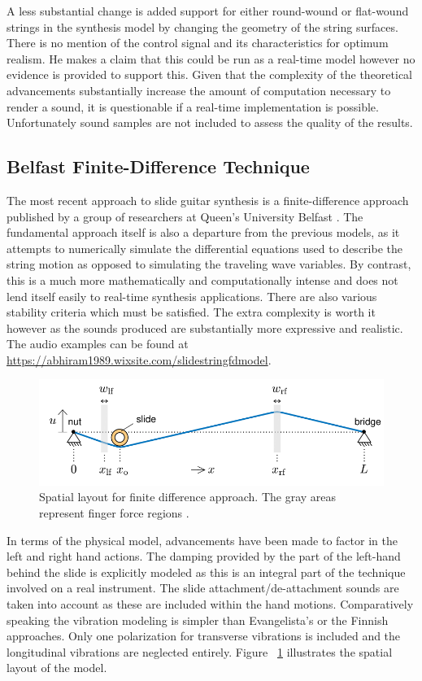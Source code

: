 \documentclass[main.tex]{subfiles}
\begin{document}
A less substantial change is added support for either round-wound or flat-wound strings in the synthesis model by changing the geometry of the string surfaces. There is no mention of the control signal and its characteristics for optimum realism. He makes a claim that this could be run as a real-time model however no evidence is provided to support this. Given that the complexity of the theoretical advancements substantially increase the amount of computation necessary to render a sound, it is questionable if a real-time implementation is possible. Unfortunately sound samples are not included to assess the quality of the results.

\subsection{Belfast Finite-Difference Technique}
The most recent approach to slide guitar synthesis is a finite-difference approach published by a group of researchers at Queen's University Belfast . The fundamental approach itself is also a departure from the previous models, as it attempts to numerically simulate the differential equations used to describe the string motion as opposed to simulating the traveling wave variables. By contrast, this is a much more mathematically and computationally intense and does not lend itself easily to real-time synthesis applications. There are also various stability criteria which must be satisfied. The extra complexity is worth it however as the sounds produced are substantially more expressive and realistic. The audio examples can be found at \url{https://abhiram1989.wixsite.com/slidestringfdmodel}.

\begin{figure}[h]
    \centering
    \includegraphics[scale=.75]{./images/diagrams/FDModel.png}
    \caption{Spatial layout for finite difference approach. The gray areas represent finger force regions .}
    \label{fig:FDModel}
\end{figure}

In terms of the physical model, advancements have been made to factor in the left and right hand actions. The damping provided by the part of the left-hand behind the slide is explicitly modeled as this is an integral part of the technique involved on a real instrument. The slide attachment/de-attachment sounds are taken into account as these are included within the hand motions. Comparatively speaking the vibration modeling is simpler than Evangelista's or the Finnish approaches. Only one polarization for transverse vibrations is included and the longitudinal vibrations are neglected entirely. Figure~ \ref{fig:FDModel} illustrates the spatial layout of the model.
\end{document}
